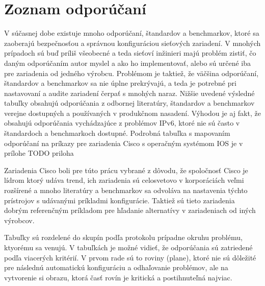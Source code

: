 \newpage
\section{Zoznam odporúčaní}

V súčasnej dobe existuje mnoho odporúčaní, štandardov a benchmarkov, ktoré sa zaoberajú bezpečnosťou a správnou konfiguráciou sieťových zariadení. V mnohých prípadoch sú buď príliš všeobecné a teda sieťoví inžinieri majú problém zistiť, čo daným odporúčaním autor myslel a ako ho implementovať, alebo sú určené iba pre zariadenia od jedného výrobcu. Problémom je taktiež, že väčšina odporúčaní, štandardov a benchmarkov sa nie úplne prekrývajú, a teda je potrebné pri nastavovaní a audite zariadení čerpať s mnohých naraz. Nižšie uvedené výsledné tabuľky obsahujú odporúčania z odbornej literatúry, štandardov a benchmarkov verejne dostupných a používaných v produkčnom nasadení. Výhodou je aj fakt, že obsahujú odporúčania vychádzajúce z problémov IPv6, ktoré nie sú často v štandardoch a benchmarkoch dostupné. Podrobná tabuľka s mapovaním odporúčaní na príkazy pre zariadenia Cisco s operačným systémom IOS je v prílohe TODO priloha %

Zariadenia Cisco boli pre túto prácu vybrané z dôvodu, že spoločnosť Cisco je lídrom ktorý udáva trend, ich zariadenia sú celosvetovo v korporáciách veľmi rozšírené a mnoho literatúry a benchmarkov sa odvoláva na nastavenia týchto prístrojov s udávanými príkladmi konfigurácie. Taktiež sú tieto zariadenia dobrým referenčným príkladom pre hľadanie alternatívy v zariadeniach od iných výrobcov.

Tabuľky sú rozdelené do skupín podľa protokolu prípadne okruhu problému, ktyorému sa venujú. V tabuľkách je možné vidieť, že odporúčania sú zatriedené podľa viacerých kritérií. V prvom rade sú to roviny (plane), ktoré nie sú dôležité pre následnú automatickú konfiguráciu a odhaľovanie problémov, ale na vytvorenie si obrazu, ktorá časť rovín je kritická a postihnuteľná najviac. 


